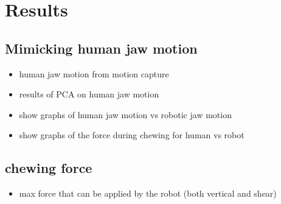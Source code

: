 \section{Results}
\subsection{Mimicking human jaw motion}
\begin{itemize}
    \item human jaw motion from motion capture
    \item results of PCA on human jaw motion
    \item show graphs of human jaw motion vs robotic jaw motion
    \item show graphs of the force during chewing for human vs robot
\end{itemize}

\subsection{chewing force}
\begin{itemize}
    \item max force that can be applied by the robot (both vertical and shear)
\end{itemize}